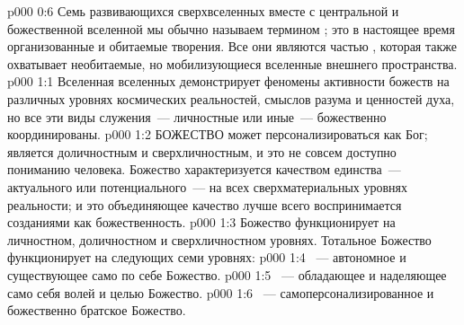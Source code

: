 \vs p000 0:6 Семь развивающихся сверхвселенных вместе с центральной и божественной вселенной мы обычно называем термином ; это в настоящее время организованные и обитаемые творения. Все они являются частью , которая также охватывает необитаемые, но мобилизующиеся вселенные внешнего пространства.
\vs p000 1:1 Вселенная вселенных демонстрирует феномены активности божеств на различных уровнях космических реальностей, смыслов разума и ценностей духа, но все эти виды служения~--- личностные или иные~--- божественно координированы.
\vs p000 1:2 \pc БОЖЕСТВО может персонализироваться как Бог; является доличностным и сверхличностным, и это не совсем доступно пониманию человека. Божество характеризуется качеством единства~--- актуального или потенциального~--- на всех сверхматериальных уровнях реальности; и это объединяющее качество лучше всего воспринимается созданиями как божественность.
\vs p000 1:3 \pc Божество функционирует на личностном, доличностном и сверхличностном уровнях. Тотальное Божество функционирует на следующих семи уровнях:
\vs p000 1:4 ~--- автономное и существующее само по себе Божество.
\vs p000 1:5 ~--- обладающее и наделяющее само себя волей и целью Божество.
\vs p000 1:6 ~--- самоперсонализированное и божественно братское Божество.
